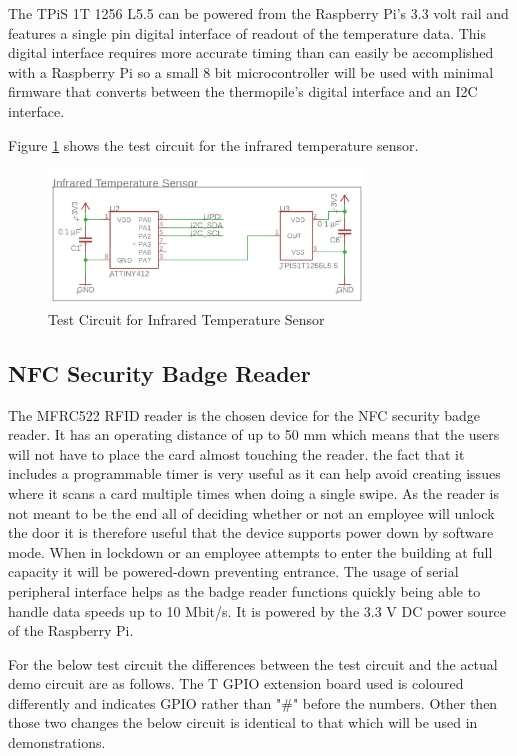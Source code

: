 The TPiS 1T 1256 L5.5 can be powered from the Raspberry Pi's 3.3 volt rail and
features a single pin digital interface of readout of the temperature data. This
digital interface requires more accurate timing than can easily be accomplished
with a Raspberry Pi so a small 8 bit microcontroller will be used with minimal
firmware that converts between the thermopile's digital interface and an I2C
interface.

Figure \ref{fig:ir-test-circuit} shows the test circuit for the infrared
temperature sensor.

\begin{figure}[!htb]
\centering
\includegraphics[width=0.75\textwidth]{images/ir-test-circuit.png}
\caption{Test Circuit for Infrared Temperature Sensor}
\label{fig:ir-test-circuit}
\end{figure}

\subsection{NFC Security Badge Reader}

The MFRC522 RFID reader is the chosen device for the NFC security badge reader. 
It has an operating distance of up to 50 mm which means that the users will not have to place
the card almost touching the reader. the fact that it includes a programmable timer
is very useful as it can help avoid creating issues where it scans a card multiple times 
when doing a single swipe. As the reader is not meant to be the end all of deciding 
whether or not an employee will unlock the door it is therefore useful that the device
supports power down by software mode. When in lockdown or an employee attempts
to enter the building at full capacity it will be powered-down preventing entrance.  
The usage of serial peripheral interface helps as the badge reader functions quickly 
being able to handle data speeds up to 10 Mbit/s. 
It is powered by the 3.3 V DC power source of the Raspberry Pi.


For the below test circuit the differences between the test circuit and the actual demo circuit
are as follows. The T GPIO extension board used is coloured differently
and indicates GPIO rather than "\#" before the numbers. 
Other then those two changes the below circuit is identical to that which will be used in demonstrations.

